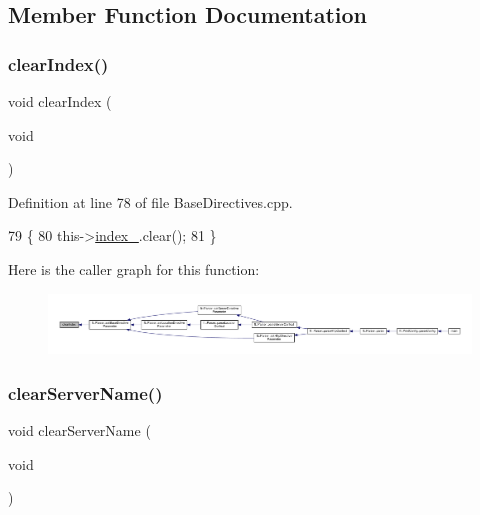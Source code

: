 \subsection{Member Function Documentation}
\mbox{\label{classft_1_1_base_directives_a36d96dc74e650162c25a325813130ab2}} 
\subsubsection{\texorpdfstring{clear\+Index()}{clearIndex()}}
{\footnotesize\ttfamily void clear\+Index (\begin{DoxyParamCaption}\item[{void}]{ }\end{DoxyParamCaption})\hspace{0.3cm}{\ttfamily [inherited]}}



Definition at line 78 of file Base\+Directives.\+cpp.


\begin{DoxyCode}
79     \{
80         this->\hyperlink{classft_1_1_base_directives_a6ba30626837f300201cd32c35d50aa49}{index\_}.clear();
81     \}
\end{DoxyCode}
Here is the caller graph for this function\+:
\nopagebreak
\begin{figure}[H]
\begin{center}
\leavevmode
\includegraphics[width=350pt]{classft_1_1_base_directives_a36d96dc74e650162c25a325813130ab2_icgraph}
\end{center}
\end{figure}
\mbox{\label{classft_1_1_server_block_aaf4aa7d96124b157e91274eb88c77808}} 
\subsubsection{\texorpdfstring{clear\+Server\+Name()}{clearServerName()}}
{\footnotesize\ttfamily void clear\+Server\+Name (\begin{DoxyParamCaption}\item[{void}]{ }\end{DoxyParamCaption})}



